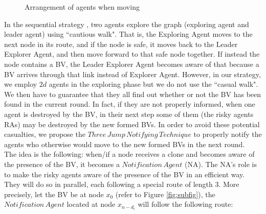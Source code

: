 \begin{figure} [H]
  \centering 
  \hspace{1in} 
  \caption{Arrangement of agents when moving} 
  \label{fig:subfig1} %
\end{figure}

In the sequential strategy \cite{Alotaibi},  two agents explore the graph (exploring agent and leader agent)  using  ``cautious walk". That is, the Exploring Agent moves to the next node in its route, and if the node is safe, it moves back to the Leader Explorer Agent, and then move forward to that safe node together. If instead the node contains a BV, the Leader Explorer Agent becomes aware of that because a BV arrives through that link instead of Explorer Agent. 
However, in our strategy, we employ $2d$ agents in the exploring phase but we do not use the ``casual walk". We then have to guarantee that they all find out whether or not the BV has been found in the current round. In fact, if they are not properly informed, when one agent is destroyed by the BV, in their next step some of them (the risky agents RAs) may be destroyed by the new formed BVs. In order to avoid these potential casualties, we propose the $Three\,Jump\,Notifying\,Technique$ to properly notify the agents who otherwise would move to the new formed BVs in the next round.\\

The idea is the following: when/if a node receives a clone and becomes aware of the presence of the BV,  it becomes a  $Notification\,Agent$ (NA). The NA's role is to make the risky agents aware of the presence of the BV in an efficient way. They will do so in parallel, each following  a special  route of length 3.  More precisely, let the BV be at node $x_0$ (refer to Figure \ref{fig:subfig}), the $Notification\,Agent$ located at node $x_{n-d_i}$ will follow the following route:

